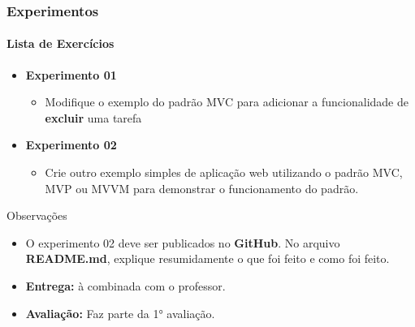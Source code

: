 \documentclass[
	9pt, %
	t, %
]{beamer}
\begin{document}
\begin{frame}
	\frametitle{Experimentos}
	\framesubtitle{Lista de Exercícios}

	\begin{itemize}
		\item \textbf{Experimento 01}
		      \begin{itemize}
			      \item Modifique o exemplo do padrão MVC para adicionar a funcionalidade de
			            \textbf{excluir} uma tarefa
		      \end{itemize}
		\item \textbf{Experimento 02}
		      \begin{itemize}
			      \item Crie outro exemplo simples de aplicação web utilizando o padrão MVC, MVP ou
			            MVVM para demonstrar o funcionamento do padrão.
		      \end{itemize}
	\end{itemize}

	\begin{block}{Observações}
		\begin{itemize}
			\item O experimento 02 deve ser publicados no \textbf{GitHub}. No arquivo
			      \textbf{README.md}, explique resumidamente o que foi feito e como foi feito.
			\item \textbf{Entrega:} à combinada com o professor.
			\item \textbf{Avaliação:} Faz parte da 1° avaliação.
		\end{itemize}
	\end{block}

\end{frame}



\end{document}
